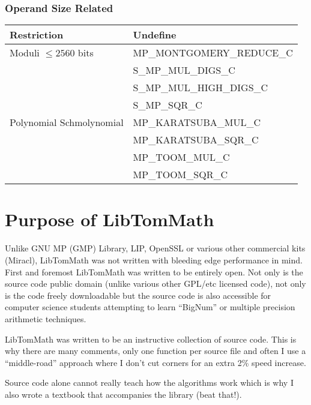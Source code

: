 \documentclass[synpaper]{book}
\begin{document}
\subsubsection{Operand Size Related}
\begin{small}
\begin{center}
\begin{tabular}{|l|l|}
\hline \textbf{Restriction} & \textbf{Undefine} \\
\hline Moduli $\le 2560$ bits              & MP\_MONTGOMERY\_REDUCE\_C \\
                                           & S\_MP\_MUL\_DIGS\_C \\
                                           & S\_MP\_MUL\_HIGH\_DIGS\_C \\
                                           & S\_MP\_SQR\_C \\
\hline Polynomial Schmolynomial            & MP\_KARATSUBA\_MUL\_C \\
                                           & MP\_KARATSUBA\_SQR\_C \\
                                           & MP\_TOOM\_MUL\_C \\
                                           & MP\_TOOM\_SQR\_C \\

\hline
\end{tabular}
\end{center}
\end{small}


\section{Purpose of LibTomMath}
Unlike  GNU MP (GMP) Library, LIP, OpenSSL or various other commercial kits (Miracl), LibTomMath was not written with
bleeding edge performance in mind.  First and foremost LibTomMath was written to be entirely open.  Not only is the
source code public domain (unlike various other GPL/etc licensed code), not only is the code freely downloadable but the
source code is also accessible for computer science students attempting to learn ``BigNum'' or multiple precision
arithmetic techniques.

LibTomMath was written to be an instructive collection of source code.  This is why there are many comments, only one
function per source file and often I use a ``middle-road'' approach where I don't cut corners for an extra 2\% speed
increase.

Source code alone cannot really teach how the algorithms work which is why I also wrote a textbook that accompanies
the library (beat that!).
\end{document}
